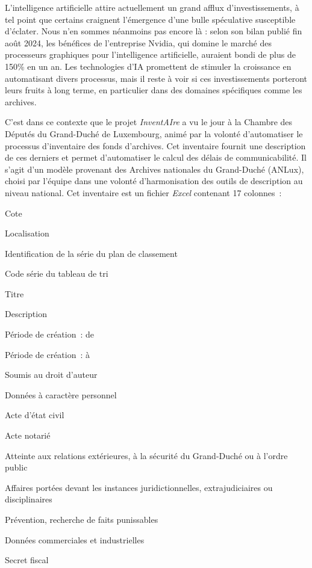 
  	L'intelligence artificielle attire actuellement un grand afflux d'investissements, 
  	à tel point que certains craignent l'émergence d'une bulle spéculative susceptible d'éclater.
	Nous n'en sommes néanmoins pas encore là : selon son bilan publié fin août 2024, les bénéfices de l'entreprise Nvidia, qui domine le marché des
	processeurs graphiques pour l'intelligence artificielle, auraient bondi de plus de 150\% en un an.
	Les technologies d'IA promettent de stimuler la croissance en automatisant divers processus, 
	mais il reste à voir si ces investissements porteront leurs fruits à long terme, 
	en particulier dans des domaines spécifiques comme les archives.

 	
	C'est dans ce contexte que le projet \emph{InventAIre} a vu le jour à la Chambre des Députés du Grand-Duché de Luxembourg,
	 animé par la volonté d'automatiser le processus d'inventaire des fonds d'archives. 
	 Cet inventaire fournit une description de ces derniers et permet d'automatiser le calcul des délais de communicabilité.
	 Il s'agit d'un modèle provenant des Archives
	nationales du Grand-Duché (ANLux), choisi par l'équipe dans une
	volonté d'harmonisation des outils de description au niveau national.
	Cet inventaire est un fichier \emph{Excel} contenant 17 colonnes~:
	\begin{multicols}{3}
			\begin{itemize}\footnotesize{
					\item Cote
					\item Localisation
					\item Identification de la série du plan de classement
					\item Code série du tableau de tri
					\item Titre
					\item Description
					\item Période de création~: de
					\item Période de création~: à
					\item Soumis au droit d'auteur
					\item Données à caractère personnel
					\item Acte d'état civil
					\item Acte notarié
					\item Atteinte aux relations extérieures, à la sécurité du Grand-Duché ou à
					l'ordre public
					\item Affaires portées devant les instances juridictionnelles,
					extrajudiciaires ou disciplinaires
					\item Prévention, recherche de faits punissables
					\item Données commerciales et industrielles
					\item Secret fiscal}
				\end{itemize}
		\end{multicols}
	
